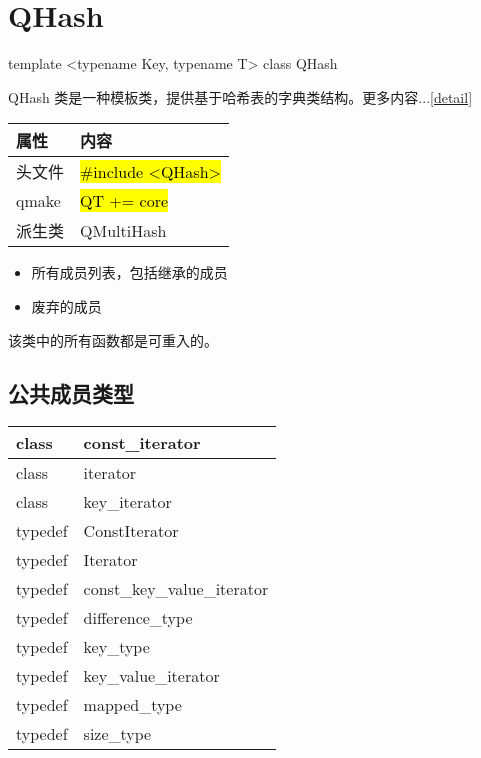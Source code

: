 \chapter{QHash}\label{hash}

template <typename Key, typename T> class QHash

QHash 类是一种模板类，提供基于哈希表的字典类结构。更多内容...\ref{detail}


\begin{tabular}{|l|l|}
\hline
属性& 	内容\\
\hline
头文件& 	\hl{\#include <QHash>}\\
\hline
qmake& 	\hl{QT += core}\\
\hline
派生类& 	QMultiHash\\
\hline
\end{tabular}


\begin{itemize}
\item 所有成员列表，包括继承的成员
\item 废弃的成员
\end{itemize}

\begin{notice}
该类中的所有函数都是可重入的。
\end{notice}

\splitLine

\section{公共成员类型}

\begin{tabular}{|m{5em}|m{30em}|}
\hline
class& 	const\_iterator\\
\hline
class& 	iterator\\
\hline
class& 	key\_iterator\\
\hline
typedef& 	ConstIterator\\
\hline
typedef& 	Iterator\\
\hline
typedef& 	const\_key\_value\_iterator\\
\hline
typedef& 	difference\_type\\
\hline
typedef& 	key\_type\\
\hline
typedef& 	key\_value\_iterator\\
\hline
typedef& 	mapped\_type\\
\hline
typedef& 	size\_type\\
\hline
\end{tabular}

